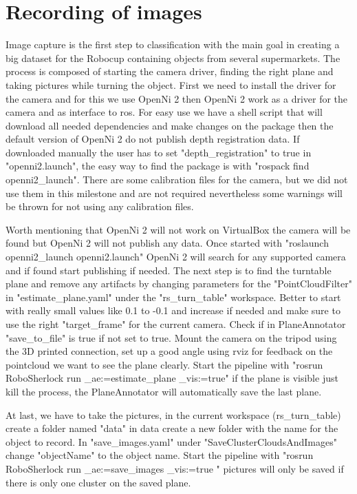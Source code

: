 \documentclass[main.tex]{subfiles}
\begin{document}
		\section{Recording of images}  
		Image capture is the first step to classification with the main goal in creating a big dataset
		for the Robocup containing objects from several supermarkets.
		The process is composed of starting the camera driver,
		finding the right plane and taking pictures while turning the object.
		First we need to install the driver for the camera and for this we use OpenNi 2
		then OpenNi 2 work as a driver for the camera and as interface to ros.
		For easy use we have a shell script that will download all needed dependencies
		and make changes on the package then the default version of OpenNi 2 do
 		not publish depth registration data. 
		If downloaded manually the user has to set "depth\_registration" to true in "openni2.launch", 
		the easy way to find the package is with "rospack find openni2\_launch". 
		There are some calibration files for the camera, but we did not use them in this milestone 
		and are not required nevertheless some warnings will be thrown for not using any calibration files.

		Worth mentioning that OpenNi 2 will not work on VirtualBox the camera will be found but OpenNi 2 will not publish any data.
		Once started with "roslaunch openni2\_launch openni2.launch" OpenNi 2 will search for any supported camera and
		if found start publishing if needed. The next step is to find the turntable plane and remove any artifacts by changing parameters
		for the "PointCloudFilter" in "estimate\_plane.yaml" under the "rs\_turn\_table" workspace.
		Better to start with really small values like 0.1 to -0.1 and increase if needed 
		and make sure to use the right "target\_frame" for the current camera. 
		Check if in PlaneAnnotator "save\_to\_file" is true if not set to true.
		Mount the camera on the tripod using the 3D printed connection,
		set up a good angle using rviz for feedback on the pointcloud we want to see the plane clearly.
		Start the pipeline with "rosrun RoboSherlock run \_ae:=estimate\_plane \_vis:=true"
		if the plane is visible just kill the process, the PlaneAnnotator will automatically save the last plane.

		At last, we have to take the pictures, in the current workspace (rs\_turn\_table) create a folder named "data" 
		in data create a new folder with the name for the object to record.
		In "save\_images.yaml" under "SaveClusterCloudsAndImages" change "objectName" to the object name.
		Start the pipeline with "rosrun RoboSherlock run \_ae:=save\_images \_vis:=true " pictures will only be saved
		if there is only one cluster on the saved plane.
\end{document}

